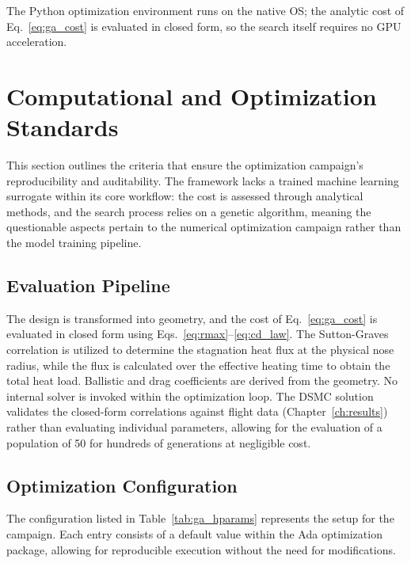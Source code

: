 The Python optimization environment runs on the native OS; the analytic cost of Eq.~\eqref{eq:ga_cost} is evaluated in closed form, so the search itself requires no GPU acceleration.

\section{Computational and Optimization Standards}
\label{sec:comp_standards}

This section outlines the criteria that ensure the optimization campaign's reproducibility and auditability. The framework lacks a trained machine learning surrogate within its core workflow: the cost is assessed through analytical methods, and the search process relies on a genetic algorithm, meaning the questionable aspects pertain to the numerical optimization campaign rather than the model training pipeline.

\subsection{Evaluation Pipeline}
The design is transformed into geometry, and the cost of Eq.~\eqref{eq:ga_cost} is evaluated in closed form using Eqs.~\eqref{eq:rmax}--\eqref{eq:cd_law}. The Sutton-Graves correlation is utilized to determine the stagnation heat flux at the physical nose radius, while the flux is calculated over the effective heating time to obtain the total heat load. Ballistic and drag coefficients are derived from the geometry. No internal solver is invoked within the optimization loop. The DSMC solution validates the closed-form correlations against flight data (Chapter~\ref{ch:results}) rather than evaluating individual parameters, allowing for the evaluation of a population of 50 for hundreds of generations at negligible cost.

\subsection{Optimization Configuration}
The configuration listed in Table~\ref{tab:ga_hparams} represents the setup for the campaign. Each entry consists of a default value within the Ada optimization package, allowing for reproducible execution without the need for modifications.

